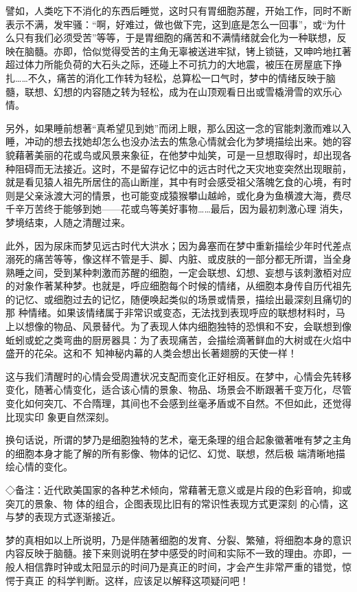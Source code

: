 \documentclass{article}
\begin{document}
譬如，人类吃下不消化的东西后睡觉，这时只有胃细胞苏醒，开始工作，同时不断表示不满，发牢骚：“啊，好难过，做也做下完，这到底是怎么一回事”，或“为什么只有我们必须受苦”等等，于是胃细胞的痛苦和不满情绪就会化为一种联想，反映在脑髓。亦即，恰似觉得受苦的主角无辜被送进牢狱，铐上锁链，又呻吟地扛著超过体力所能负荷的大石头之际，还碰上不可抗力的大地震，被压在房屋底下挣扎……不久，痛苦的消化工作转为轻松，总算松一口气时，梦中的情绪反映于脑髓，联想、幻想的内容随之转为轻松，成为在山顶观看日出或雪橇滑雪的欢乐心
情。 

\newpage

另外，如果睡前想著“真希望见到她”而闭上眼，那么因这一念的官能刺激而难以入睡，冲动的想去找她却怎么也没办法去的焦急心情就会化为梦境描绘出来。她的容貌藉著美丽的花或鸟或风景来象征，在他梦中灿笑，可是一旦想取得时，却出现各种阻碍而无法接近。这时，不是留存记忆中的远古时代之天灾地变突然出现眼前，就是看见猿人祖先所居住的高山断崖，其中有时会感受祖父落魄乞食的心境，有时则是父亲泳渡大河的情景，也可能变成猿猴攀山越岭，或化身为鱼横渡大海，费尽千辛万苦终于能够到她——花或鸟等美好事物……最后，因为最初刺激心理
消失，梦境结束，人随之清醒过来。 

此外，因为尿床而梦见远古时代大洪水；因为鼻塞而在梦中重新描绘少年时代差点溺死的痛苦等等，像这样不管是手、脚、内脏、或皮肤的一部分都无所谓，当全身熟睡之间，受到某种刺激而苏醒的细胞，一定会联想、幻想、妄想与该刺激栢对应的对象作著某种梦。也就是，呼应细胞每个时候的情绪，从细胞本身传自历代祖先的记忆、或细胞过去的记忆，随便唤起类似的场景或情景，描绘出最深刻且痛切的那
\newpage
种情绪。如果该情绪属于非常识或变态，无法找到表现呼应的联想材料时，马上以想像的物品、风景替代。为了表现人体内细胞独特的恐惧和不安，会联想到像蚯蚓或蛇之类弯曲的厨房器具：为了表现痛苦，会描绘滴著鲜血的大树或在火焰中盛开的花朵。这和不
知神秘内幕的人类会想出长著翅膀的天使一样！ 

这与我们清醒时的心情会受周遭状况支配而变化正好相反。在梦中，心情会先转移变化，随著心情变化，适合该心情的景象、物品、场景会不断跟著千变万化，尽管变化如何突兀、不合隋理，其间也不会感到丝毫矛盾或不自然。不但如此，还觉得比现实印
象更自然深刻。 

换句话说，所谓的梦乃是细胞独特的艺术，毫无条理的组合起象徽著唯有梦之主角的细胞本身才能了解的所有影像、物体的记忆、幻觉、联想，然后极
端清晰地描绘心情的变化。 

◇备注：近代欧美国家的各种艺术倾向，常藉著无意义或是片段的色彩音响，抑或突兀的景象、物
\newpage
体的组合，企图表现比旧有的常识性表现方式更深刻
的心情，这与梦的表现方式逐渐接近。 

梦的真相如以上所说明，乃是伴随著细胞的发育、分裂、繁殖，将细胞本身的意识内容反映于脑髓。接下来则说明在梦中感受的时间和实际不一致的理由。亦即，一般人相信靠时钟或太阳显示的时间乃是真正的时间，才会产生非常严重的错觉，惊愕于真正
的科学判断。这样，应该足以解释这项疑问吧！ 
\end{document}
